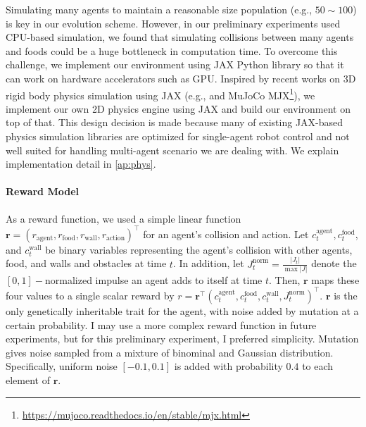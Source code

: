 Simulating many agents to maintain a reasonable size population (e.g., $50\sim 100$) is key in our evolution scheme. However, in our preliminary experiments used CPU-based simulation, we found that simulating collisions between many agents and foods could be a huge bottleneck in computation time. To overcome this challenge, we implement our environment using JAX Python library \citep{jax2018github} so that it can work on hardware accelerators such as GPU. Inspired by recent works on 3D rigid body physics simulation using JAX (e.g., \citet{brax2021github} and MuJoCo \citep{todorov2012mujoco} MJX\footnote{\url{https://mujoco.readthedocs.io/en/stable/mjx.html}}), we implement our own 2D physics engine using JAX and build our environment on top of that. This design decision is made because many of existing JAX-based physics simulation libraries are optimized for single-agent robot control and not well suited for handling multi-agent scenario we are dealing with. We explain implementation detail in \cref{ap:phys}.

\paragraph{Reward Model}




As a reward function, we used a simple linear function $\mathbf{r} = \left(r_{\textrm{agent}}, r_{\textrm{food}}, r_{\textrm{wall}}, r_{\textrm{action}} \right)^{\intercal} $ for an agent's collision and action. Let $c_{t}^{\textrm{agent}}, c_{t}^{\textrm{food}}$, and $c_{t}^{\textrm{wall}}$ be binary variables representing the agent's collision with other agents, food, and walls and obstacles at time $t$. In addition, let $J_{t}^{\textrm{norm}} = \frac{|J_{t}|}{\max{|J|}}$ denote the $[0, 1]-$normalized impulse an agent adds to itself at time $t$. Then, $\mathbf{r}$ maps these four values to a single scalar reward by $r = \mathbf{r}^{\intercal} (c_{t}^{\textrm{agent}}, c_{t}^{\textrm{food}}, c_{t}^{\textrm{wall}}, J_{t}^{\textrm{norm}})^{\intercal}$. $\mathbf{r}$ is the only genetically inheritable trait for the agent, with noise added by mutation at a certain probability. I may use a more complex reward function in future experiments, but for this preliminary experiment, I preferred simplicity. Mutation gives noise sampled from a mixture of binominal and Gaussian distribution. Specifically, uniform noise $[-0.1, 0.1]$ is added with probability $0.4$ to each element of $\mathbf{r}$.

